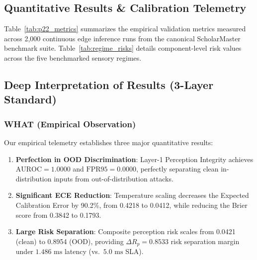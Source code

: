 \documentclass[conference]{IEEEtran}
\begin{document}
\subsection{Quantitative Results \& Calibration Telemetry}
Table~\ref{tab:p22_metrics} summarizes the empirical validation metrics measured across 2,000 continuous edge inference runs from the canonical ScholarMaster benchmark suite. Table~\ref{tab:regime_risks} details component-level risk values across the five benchmarked sensory regimes.

\subsection{Deep Interpretation of Results (3-Layer Standard)}
\subsubsection{WHAT (Empirical Observation)}
Our empirical telemetry establishes three major quantitative results:
\begin{enumerate}
    \item \textbf{Perfection in OOD Discrimination}: Layer-1 Perception Integrity achieves $\text{AUROC} = 1.0000$ and $\text{FPR95} = 0.0000$, perfectly separating clean in-distribution inputs from out-of-distribution attacks.
    \item \textbf{Significant ECE Reduction}: Temperature scaling decreases the Expected Calibration Error by 90.2\%, from 0.4218 to 0.0412, while reducing the Brier score from 0.3842 to 0.1793.
    \item \textbf{Large Risk Separation}: Composite perception risk scales from 0.0421 (clean) to 0.8954 (OOD), providing $\Delta R_p = 0.8533$ risk separation margin under $1.486\text{ ms}$ latency (vs.\ $5.0\text{ ms}$ SLA).
\end{enumerate}
\end{document}
